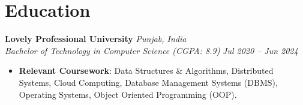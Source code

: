 \documentclass[a4paper,10pt]{article}
\begin{document}
\vspace{1pt}
\section{Education}
\vspace{1pt}
\textbf{Lovely Professional University} \hfill \textit{Punjab, India} \\
\textit{Bachelor of Technology in Computer Science (CGPA: 8.9)} \hfill \textit{Jul 2020 – Jun 2024}
\begin{itemize}[label={\textbullet}, itemsep=0.02em, leftmargin=*]
\item \textbf{Relevant Coursework}: Data Structures \& Algorithms, Distributed Systems, Cloud Computing, Database Management Systems (DBMS), Operating Systems, Object Oriented Programming (OOP).
\end{itemize}
\end{document}
